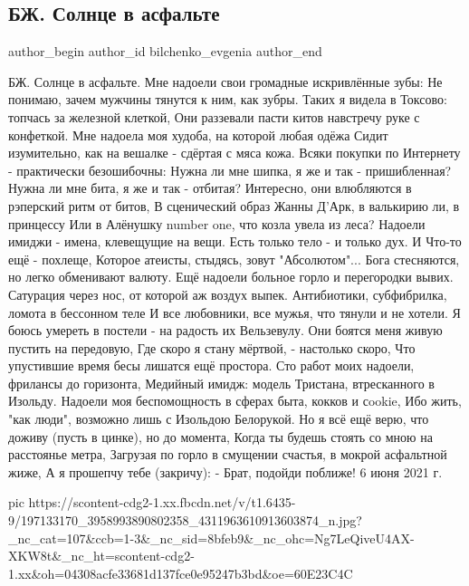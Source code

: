  
 
 
 
 
 
\subsection{БЖ. Солнце в асфальте}
\label{sec:06_06_2021.fb.bilchenko_evgenia.3.solnce_v_asfalte}
\ifcmt
 author_begin
   author_id bilchenko_evgenia
 author_end
\fi

БЖ. Солнце в асфальте.
Мне надоели свои громадные искривлённые зубы:
Не понимаю, зачем мужчины тянутся к ним, как зубры.
Таких я видела в Токсово: топчась за железной клеткой,
Они раззевали пасти китов навстречу руке с конфеткой.
Мне надоела моя худоба, на которой любая одёжа
Сидит изумительно, как на вешалке - сдёртая с мяса кожа.
Всяки покупки по Интернету - практически безошибочны:
Нужна ли мне шипка, я же и так - пришибленная?
Нужна ли мне бита, я же и так - отбитая?
Интересно, они влюбляются в рэперский ритм от битов,
В сценический образ Жанны Д'Арк, в валькирию ли, в принцессу
Или в Алёнушку number one, что козла увела из леса?
Надоели имиджи - имена, клевещущие на вещи.
Есть только тело - и только дух. И Что-то ещё - похлеще,
Которое атеисты, стыдясь, зовут "Абсолютом"...
Бога стесняются, но легко обменивают валюту.
Ещё надоели больное горло и перегородки вывих.
Сатурация через нос, от которой аж воздух выпек.
Антибиотики, субфибрилка, ломота в бессонном теле
И все любовники, все мужья, что тянули и не хотели.
Я боюсь умереть в постели - на радость их Вельзевулу.
Они боятся меня живую пустить на передовую,
Где скоро я стану мёртвой, - настолько скоро,
Что упустившие время бесы лишатся ещё простора.
Сто работ моих надоели, фрилансы до горизонта,
Медийный имидж: модель Тристана, втресканного в Изольду.
Надоели моя беспомощность в сферах быта, кокков и сookie,
Ибо жить, "как люди", возможно лишь с Изольдою Белорукой.
Но я всё ещё верю, что доживу (пусть в цинке), но до момента,
Когда ты будешь стоять со мною на расстоянье метра,
Загрузая по горло в смущении счастья, в мокрой асфальтной жиже,
А я прошепчу тебе (закричу):
- Брат, подойди поближе!
6 июня 2021 г.

\ifcmt
  pic https://scontent-cdg2-1.xx.fbcdn.net/v/t1.6435-9/197133170_3958993890802358_4311963610913603874_n.jpg?_nc_cat=107&ccb=1-3&_nc_sid=8bfeb9&_nc_ohc=Ng7LeQiveU4AX-XKW8t&_nc_ht=scontent-cdg2-1.xx&oh=04308acfe33681d137fce0e95247b3bd&oe=60E23C4C
\fi
